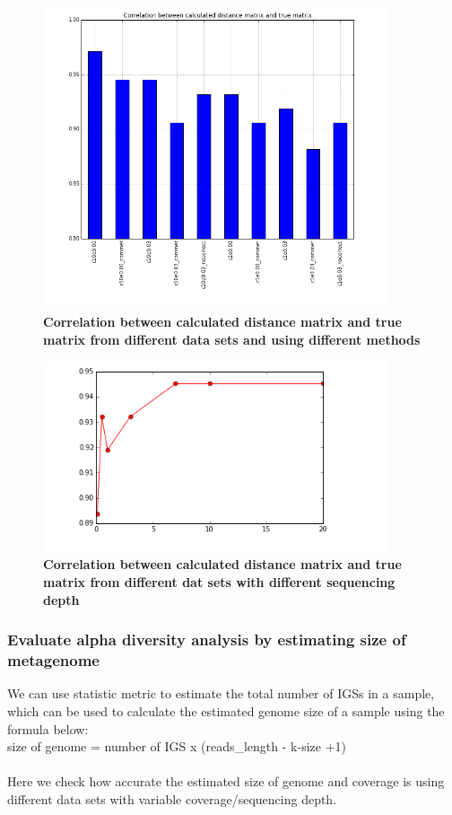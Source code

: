 \documentclass{article}
\begin{document}
\begin{figure}[!ht]
 \centerline{\includegraphics[width=4in]{./figures/IGS_correlation_methods.png}}
\caption{\bf Correlation between calculated distance matrix and true matrix from different data sets and using different methods}
\label{fig:IGS_correlation_methods}
\end{figure}


\begin{figure}[!ht]
 \centerline{\includegraphics[width=4in]{./figures/IGS_correlation_coverage.png}}
\caption{\bf Correlation between calculated distance matrix and true matrix from different dat sets with different sequencing depth}
\label{fig:IGS_correlation_coverage}
\end{figure}


\subsubsection{Evaluate alpha diversity analysis by estimating size of metagenome}

We can use statistic metric to estimate the total number of IGSs in a sample, which can be used to calculate the estimated genome size of a sample using the formula below:
\\
size of genome = number of IGS x (reads\_length - k-size +1)\\
\\
Here we check how accurate the estimated size of genome and coverage is using different data sets with variable coverage/sequencing depth.
\end{document}
